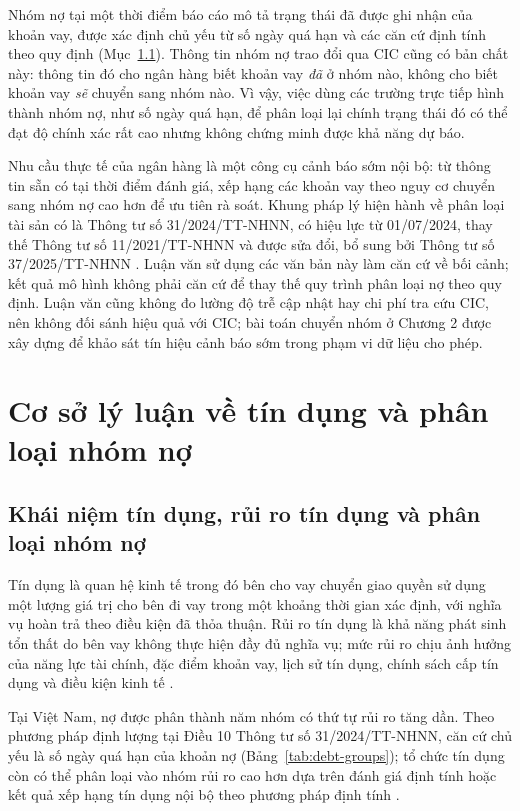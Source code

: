 Nhóm nợ tại một thời điểm báo cáo mô tả trạng thái đã được ghi nhận của khoản vay, được xác định chủ yếu từ số ngày quá hạn và các căn cứ định tính theo quy định (Mục~\ref{sec:ch1-debt-groups}). Thông tin nhóm nợ trao đổi qua CIC cũng có bản chất này: thông tin đó cho ngân hàng biết khoản vay \emph{đã} ở nhóm nào, không cho biết khoản vay \emph{sẽ} chuyển sang nhóm nào. Vì vậy, việc dùng các trường trực tiếp hình thành nhóm nợ, như số ngày quá hạn, để phân loại lại chính trạng thái đó có thể đạt độ chính xác rất cao nhưng không chứng minh được khả năng dự báo.

Nhu cầu thực tế của ngân hàng là một công cụ cảnh báo sớm nội bộ: từ thông tin sẵn có tại thời điểm đánh giá, xếp hạng các khoản vay theo nguy cơ chuyển sang nhóm nợ cao hơn để ưu tiên rà soát. Khung pháp lý hiện hành về phân loại tài sản có là Thông tư số 31/2024/TT-NHNN, có hiệu lực từ 01/07/2024, thay thế Thông tư số 11/2021/TT-NHNN và được sửa đổi, bổ sung bởi Thông tư số 37/2025/TT-NHNN \cite{sbv2024tt31,sbv2025tt37,sbv2021tt11}. Luận văn sử dụng các văn bản này làm căn cứ về bối cảnh; kết quả mô hình không phải căn cứ để thay thế quy trình phân loại nợ theo quy định. Luận văn cũng không đo lường độ trễ cập nhật hay chi phí tra cứu CIC, nên không đối sánh hiệu quả với CIC; bài toán chuyển nhóm ở Chương 2 được xây dựng để khảo sát tín hiệu cảnh báo sớm trong phạm vi dữ liệu cho phép.

\section{Cơ sở lý luận về tín dụng và phân loại nhóm nợ}

\subsection{Khái niệm tín dụng, rủi ro tín dụng và phân loại nhóm nợ}
\label{sec:ch1-debt-groups}

Tín dụng là quan hệ kinh tế trong đó bên cho vay chuyển giao quyền sử dụng một lượng giá trị cho bên đi vay trong một khoảng thời gian xác định, với nghĩa vụ hoàn trả theo điều kiện đã thỏa thuận. Rủi ro tín dụng là khả năng phát sinh tổn thất do bên vay không thực hiện đầy đủ nghĩa vụ; mức rủi ro chịu ảnh hưởng của năng lực tài chính, đặc điểm khoản vay, lịch sử tín dụng, chính sách cấp tín dụng và điều kiện kinh tế \cite{basel2000creditrisk}.

Tại Việt Nam, nợ được phân thành năm nhóm có thứ tự rủi ro tăng dần. Theo phương pháp định lượng tại Điều 10 Thông tư số 31/2024/TT-NHNN, căn cứ chủ yếu là số ngày quá hạn của khoản nợ (Bảng~\ref{tab:debt-groups}); tổ chức tín dụng còn có thể phân loại vào nhóm rủi ro cao hơn dựa trên đánh giá định tính hoặc kết quả xếp hạng tín dụng nội bộ theo phương pháp định tính \cite{sbv2024tt31}.

